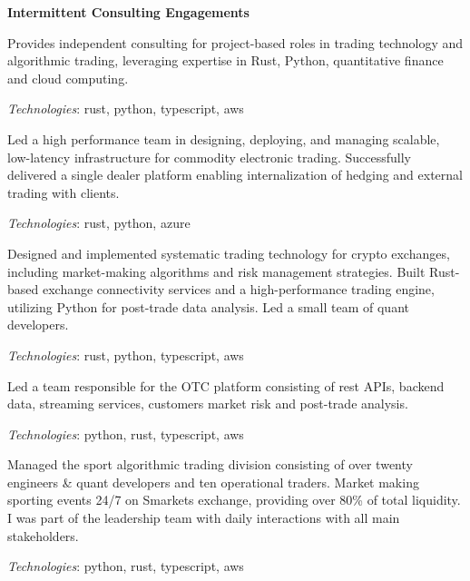 {\bf Intermittent Consulting Engagements}

Provides independent consulting for project-based roles in trading technology and algorithmic trading,
leveraging expertise in Rust, Python, quantitative finance and cloud computing.

{\it Technologies}: rust, python, typescript, aws


Led a high performance team in designing, deploying, and managing scalable, low-latency infrastructure
for commodity electronic trading. Successfully delivered a single dealer platform
enabling internalization of hedging and external trading with clients.

{\it Technologies}: rust, python, azure


Designed and implemented systematic trading technology for crypto exchanges,
including market-making algorithms and risk management strategies.
Built Rust-based exchange connectivity services and a high-performance trading engine,
utilizing Python for post-trade data analysis. Led a small team of quant developers.

{\it Technologies}: rust, python, typescript, aws


Led a team responsible for the OTC platform consisting of rest APIs,
backend data, streaming services, customers market risk and post-trade analysis.

{\it Technologies}: python, rust, typescript, aws


Managed the sport algorithmic trading division consisting of over twenty engineers \& quant developers and ten operational traders.
Market making sporting events 24/7 on Smarkets exchange, providing over 80\% of total liquidity.
I was part of the leadership team with daily interactions with all main stakeholders.

{\it Technologies}: python, rust, typescript, aws


